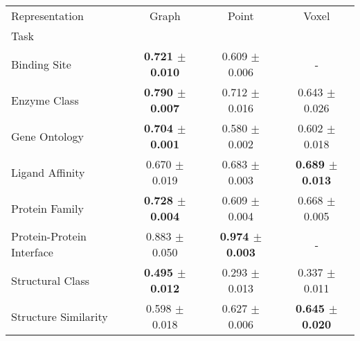 \begin{tabular}{lccc}
\toprule
Representation & Graph & Point & Voxel \\
Task &  &  &  \\
\midrule
Binding Site & \textbf{0.721 $\pm$ 0.010} & 0.609 $\pm$ 0.006 & - \\
Enzyme Class & \textbf{0.790 $\pm$ 0.007} & 0.712 $\pm$ 0.016 & 0.643 $\pm$ 0.026 \\
Gene Ontology & \textbf{0.704 $\pm$ 0.001} & 0.580 $\pm$ 0.002 & 0.602 $\pm$ 0.018 \\
Ligand Affinity & 0.670 $\pm$ 0.019 & 0.683 $\pm$ 0.003 & \textbf{0.689 $\pm$ 0.013} \\
Protein Family & \textbf{0.728 $\pm$ 0.004} & 0.609 $\pm$ 0.004 & 0.668 $\pm$ 0.005 \\
Protein-Protein Interface & 0.883 $\pm$ 0.050 & \textbf{0.974 $\pm$ 0.003} & - \\
Structural Class & \textbf{0.495 $\pm$ 0.012} & 0.293 $\pm$ 0.013 & 0.337 $\pm$ 0.011 \\
Structure Similarity & 0.598 $\pm$ 0.018 & 0.627 $\pm$ 0.006 & \textbf{0.645 $\pm$ 0.020} \\
\bottomrule
\end{tabular}
